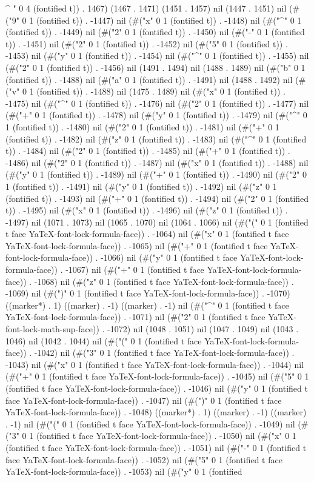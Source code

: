 ^
" 0 4 (fontified t)) . 1467) (1467 . 1471) (1451 . 1457) nil (1447 . 1451) nil (#("9" 0 1 (fontified t)) . -1447) nil (#("x" 0 1 (fontified t)) . -1448) nil (#("^" 0 1 (fontified t)) . -1449) nil (#("2" 0 1 (fontified t)) . -1450) nil (#("-" 0 1 (fontified t)) . -1451) nil (#("2" 0 1 (fontified t)) . -1452) nil (#("5" 0 1 (fontified t)) . -1453) nil (#("y" 0 1 (fontified t)) . -1454) nil (#("^" 0 1 (fontified t)) . -1455) nil (#("2" 0 1 (fontified t)) . -1456) nil (1491 . 1494) nil (1488 . 1489) nil (#("b" 0 1 (fontified t)) . -1488) nil (#("a" 0 1 (fontified t)) . -1491) nil (1488 . 1492) nil (#("v" 0 1 (fontified t)) . -1488) nil (1475 . 1489) nil (#("x" 0 1 (fontified t)) . -1475) nil (#("^" 0 1 (fontified t)) . -1476) nil (#("2" 0 1 (fontified t)) . -1477) nil (#("+" 0 1 (fontified t)) . -1478) nil (#("y" 0 1 (fontified t)) . -1479) nil (#("^" 0 1 (fontified t)) . -1480) nil (#("2" 0 1 (fontified t)) . -1481) nil (#("+" 0 1 (fontified t)) . -1482) nil (#("z" 0 1 (fontified t)) . -1483) nil (#("^" 0 1 (fontified t)) . -1484) nil (#("2" 0 1 (fontified t)) . -1485) nil (#("+" 0 1 (fontified t)) . -1486) nil (#("2" 0 1 (fontified t)) . -1487) nil (#("x" 0 1 (fontified t)) . -1488) nil (#("y" 0 1 (fontified t)) . -1489) nil (#("+" 0 1 (fontified t)) . -1490) nil (#("2" 0 1 (fontified t)) . -1491) nil (#("y" 0 1 (fontified t)) . -1492) nil (#("z" 0 1 (fontified t)) . -1493) nil (#("+" 0 1 (fontified t)) . -1494) nil (#("2" 0 1 (fontified t)) . -1495) nil (#("x" 0 1 (fontified t)) . -1496) nil (#("z" 0 1 (fontified t)) . -1497) nil (1071 . 1073) nil (1065 . 1070) nil (1064 . 1066) nil (#("(" 0 1 (fontified t face YaTeX-font-lock-formula-face)) . -1064) nil (#("x" 0 1 (fontified t face YaTeX-font-lock-formula-face)) . -1065) nil (#("+" 0 1 (fontified t face YaTeX-font-lock-formula-face)) . -1066) nil (#("y" 0 1 (fontified t face YaTeX-font-lock-formula-face)) . -1067) nil (#("+" 0 1 (fontified t face YaTeX-font-lock-formula-face)) . -1068) nil (#("z" 0 1 (fontified t face YaTeX-font-lock-formula-face)) . -1069) nil (#(")" 0 1 (fontified t face YaTeX-font-lock-formula-face)) . -1070) ((marker*) . 1) ((marker) . -1) ((marker) . -1) nil (#("^" 0 1 (fontified t face YaTeX-font-lock-formula-face)) . -1071) nil (#("2" 0 1 (fontified t face YaTeX-font-lock-math-sup-face)) . -1072) nil (1048 . 1051) nil (1047 . 1049) nil (1043 . 1046) nil (1042 . 1044) nil (#("(" 0 1 (fontified t face YaTeX-font-lock-formula-face)) . -1042) nil (#("3" 0 1 (fontified t face YaTeX-font-lock-formula-face)) . -1043) nil (#("x" 0 1 (fontified t face YaTeX-font-lock-formula-face)) . -1044) nil (#("+" 0 1 (fontified t face YaTeX-font-lock-formula-face)) . -1045) nil (#("5" 0 1 (fontified t face YaTeX-font-lock-formula-face)) . -1046) nil (#("y" 0 1 (fontified t face YaTeX-font-lock-formula-face)) . -1047) nil (#(")" 0 1 (fontified t face YaTeX-font-lock-formula-face)) . -1048) ((marker*) . 1) ((marker) . -1) ((marker) . -1) nil (#("(" 0 1 (fontified t face YaTeX-font-lock-formula-face)) . -1049) nil (#("3" 0 1 (fontified t face YaTeX-font-lock-formula-face)) . -1050) nil (#("x" 0 1 (fontified t face YaTeX-font-lock-formula-face)) . -1051) nil (#("-" 0 1 (fontified t face YaTeX-font-lock-formula-face)) . -1052) nil (#("5" 0 1 (fontified t face YaTeX-font-lock-formula-face)) . -1053) nil (#("y" 0 1 (fontified 